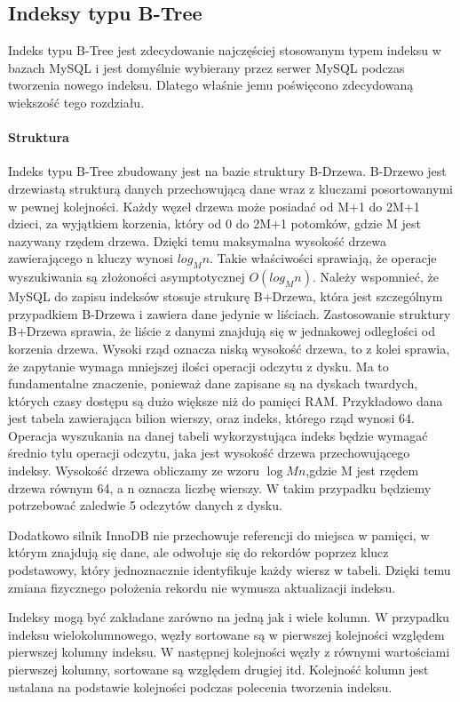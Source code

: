 \subsection{Indeksy typu B-Tree}
Indeks typu B-Tree jest zdecydowanie najczęściej stosowanym typem indeksu w bazach MySQL i jest domyślnie wybierany przez serwer MySQL podczas tworzenia nowego indeksu. Dlatego właśnie jemu poświęcono zdecydowaną wiekszość tego rozdziału.

\paragraph{Struktura}\mbox{}

Indeks typu B-Tree zbudowany jest na bazie struktury B-Drzewa. B-Drzewo jest drzewiastą strukturą danych przechowującą dane wraz z kluczami posortowanymi w pewnej kolejności. Każdy węzeł drzewa może posiadać od M+1 do 2M+1 dzieci, za wyjątkiem korzenia, który od 0 do 2M+1 potomków, gdzie M jest nazywany rzędem drzewa. Dzięki temu maksymalna wysokość drzewa zawierającego n kluczy wynosi $log_M n$. Takie właściwości sprawiają, że operacje wyszukiwania są złożoności asymptotycznej $O(log_M n)$. Należy wspomnieć, że MySQL do zapisu indeksów stosuje strukurę B+Drzewa, która jest szczególnym przypadkiem B-Drzewa i zawiera dane jedynie w liściach.
Zastosowanie struktury B+Drzewa sprawia, że liście z danymi znajdują się w jednakowej odległości od korzenia drzewa. Wysoki rząd oznacza niską wysokość drzewa, to z kolei sprawia, że zapytanie wymaga mniejszej ilości operacji odczytu z dysku. Ma to fundamentalne znaczenie, ponieważ dane zapisane są na dyskach twardych, których czasy dostępu są dużo większe niż do pamięci RAM. Przykładowo dana jest tabela zawierająca bilion wierszy, oraz indeks, którego rząd wynosi 64. Operacja wyszukania na danej tabeli wykorzystująca indeks będzie wymagać średnio tylu operacji odczytu, jaka jest wysokość drzewa przechowującego indeksy. Wysokość drzewa obliczamy ze wzoru $\log M n$,gdzie M jest rzędem drzewa równym 64, a n oznacza liczbę wierszy. W takim przypadku będziemy potrzebować zaledwie 5 odczytów danych z dysku. 

Dodatkowo silnik InnoDB nie przechowuje referencji do miejsca w pamięci, w którym znajdują się dane, ale odwołuje się do rekordów poprzez klucz podstawowy, który jednoznacznie identyfikuje każdy wiersz w tabeli. Dzięki temu zmiana fizycznego położenia rekordu nie wymusza aktualizacji indeksu. 

Indeksy mogą być zakładane zarówno na jedną jak i wiele kolumn. W przypadku indeksu wielokolumnowego, węzły sortowane są w pierwszej kolejności względem pierwszej kolumny indeksu. W następnej kolejności węzły z równymi wartościami pierwszej kolumny, sortowane są względem drugiej itd. Kolejność kolumn jest ustalana na podstawie kolejności podczas polecenia tworzenia indeksu.

